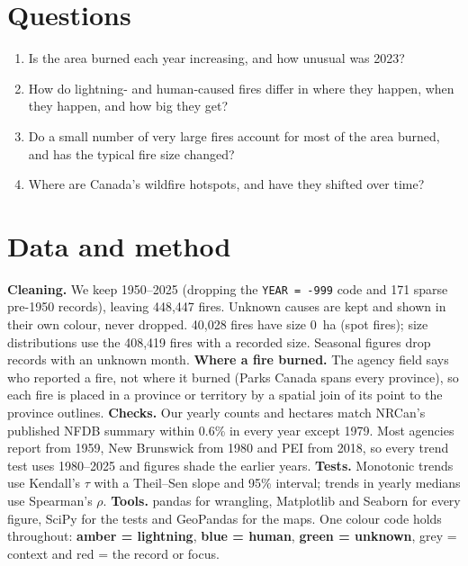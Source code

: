 \documentclass[12pt,letterpaper]{article}
\begin{document}
\section{Questions}
\begin{enumerate}[label=\textbf{Q\arabic*.}, leftmargin=*]
  \item Is the area burned each year increasing, and how unusual was 2023?
  \item How do lightning- and human-caused fires differ in where they happen, when they happen, and how big they get?
  \item Do a small number of very large fires account for most of the area burned, and has the typical fire size changed?
  \item Where are Canada's wildfire hotspots, and have they shifted over time?
\end{enumerate}

\section{Data and method}
\textbf{Cleaning.} We keep 1950--2025 (dropping the \texttt{YEAR = -999} code and 171 sparse pre-1950 records), leaving 448,447 fires. Unknown causes are kept and shown in their own colour, never dropped. 40,028 fires have size 0~ha (spot fires); size distributions use the 408,419 fires with a recorded size. Seasonal figures drop records with an unknown month.
\textbf{Where a fire burned.} The agency field says who reported a fire, not where it burned (Parks Canada spans every province), so each fire is placed in a province or territory by a spatial join of its point to the province outlines.
\textbf{Checks.} Our yearly counts and hectares match NRCan's published NFDB summary within 0.6\% in every year except 1979. Most agencies report from 1959, New Brunswick from 1980 and PEI from 2018, so every trend test uses 1980--2025 and figures shade the earlier years.
\textbf{Tests.} Monotonic trends use Kendall's $\tau$ with a Theil--Sen slope and 95\% interval; trends in yearly medians use Spearman's $\rho$.
\textbf{Tools.} pandas for wrangling, Matplotlib and Seaborn for every figure, SciPy for the tests and GeoPandas for the maps. One colour code holds throughout: \textcolor[HTML]{C77700}{\textbf{amber = lightning}}, \textcolor[HTML]{1F5A99}{\textbf{blue = human}}, \textcolor[HTML]{2E9E6E}{\textbf{green = unknown}}, grey = context and red = the record or focus.

\end{document}
